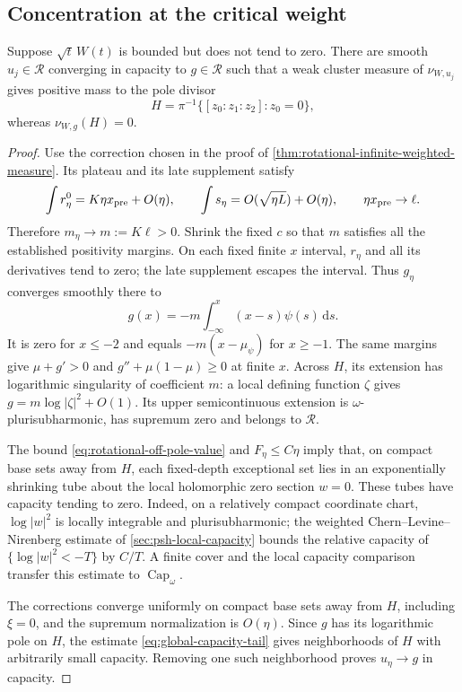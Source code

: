 \subsection{Concentration at the critical weight}

\begin{lemma}\label{lem:rotational-critical-concentration}
Suppose $\sqrt t\,W(t)$ is bounded but does not tend to zero. There are smooth $u_j\in\mathcal R$ converging in capacity to $g\in\mathcal R$ such that a weak cluster measure of $\nu_{W,u_j}$ gives positive mass to the pole divisor
\[
 H=\pi^{-1}\{[z_0:z_1:z_2]:z_0=0\},
\]
whereas $\nu_{W,g}(H)=0$.
\end{lemma}
\begin{proof}
Use the correction chosen in the proof of \cref{thm:rotational-infinite-weighted-measure}. Its plateau and its late supplement satisfy
\[
 \int r^0_\eta=K\eta x_{\rm pre}+O(\eta),\qquad
 \int s_\eta=O(\sqrt{\eta L})+O(\eta),\qquad
 \eta x_{\rm pre}\to\ell.
\]
Therefore $m_\eta\to m:=K\ell>0$. Shrink the fixed $c$ so that $m$
satisfies all the established positivity margins. On each fixed finite
$x$ interval, $r_\eta$ and all its derivatives tend to zero; the late
supplement escapes the interval. Thus $g_\eta$ converges smoothly there to
\[
 g(x)=-m\int_{-\infty}^x(x-s)\psi(s)\,\mathrm ds.
\]
It is zero for $x\leq-2$ and equals $-m(x-\mu_\psi)$ for $x\geq-1$.
The same margins give $\mu+g'>0$ and
$g''+\mu(1-\mu)\geq0$ at finite $x$.
Across $H$, its extension has logarithmic singularity of coefficient $m$: a local defining function $\zeta$ gives $g=m\log|\zeta|^2+O(1)$.
Its upper semicontinuous extension is $\omega$-plurisubharmonic, has supremum zero and belongs to $\mathcal R$.

The bound \eqref{eq:rotational-off-pole-value} and $F_\eta\leq C\eta$ imply that, on compact base sets away from $H$, each fixed-depth exceptional set lies in an exponentially shrinking tube about the local holomorphic zero section $w=0$. These tubes have capacity tending to zero. Indeed, on a relatively compact coordinate chart, $\log|w|^2$ is locally integrable and plurisubharmonic; the weighted Chern--Levine--Nirenberg estimate of \cref{sec:psh-local-capacity} bounds the relative capacity of $\{\log|w|^2<-T\}$ by $C/T$. A finite cover and the local capacity comparison transfer this estimate to $\operatorname{Cap}_\omega$.

The corrections converge uniformly on compact base sets away from $H$, including $\xi=0$, and the supremum normalization is $O(\eta)$. Since $g$ has its logarithmic pole on $H$, the estimate \eqref{eq:global-capacity-tail} gives neighborhoods of $H$ with arbitrarily small capacity. Removing one such neighborhood proves $u_\eta\to g$ in capacity.


\end{proof}
